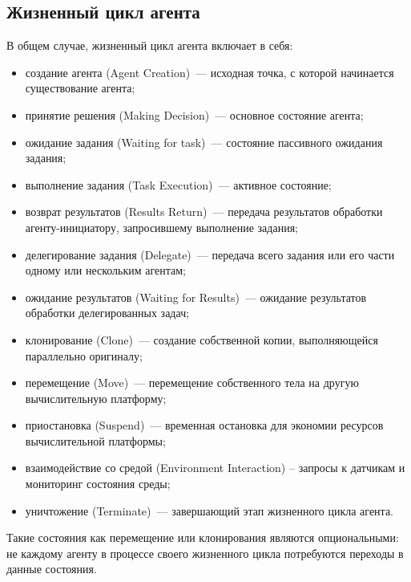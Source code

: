 \subsection{Жизненный цикл агента}
В общем случае, жизненный цикл агента включает в себя:
\begin{itemize}
\item создание агента (Agent Creation)~--- исходная точка, с которой начинается существование агента;
\item принятие решения (Making Decision)~--- основное состояние агента;
\item ожидание задания (Waiting for task)~--- состояние пассивного ожидания задания;
\item выполнение задания (Task Execution)~--- активное состояние;
\item возврат результатов (Results Return)~--- передача результатов обработки агенту-инициатору, запросившему выполнение задания;
\item делегирование задания (Delegate)~--- передача всего задания или его части одному или нескольким агентам;
\item ожидание результатов (Waiting for Results)~--- ожидание результатов обработки делегированных задач;
\item клонирование (Clone)~--- создание собственной копии, выполняющейся параллельно оригиналу;
\item перемещение (Move)~--- перемещение собственного тела на другую вычислительную платформу;
\item приостановка (Suspend)~--- временная остановка для экономии ресурсов вычислительной платформы;
\item взаимодействие со средой (Environment Interaction) – запросы к датчикам и мониторинг состояния среды;
\item уничтожение (Terminate)~--- завершающий этап жизненного цикла агента.
\end{itemize}

Такие состояния как перемещение или клонирования являются опциональными: не каждому агенту в процессе своего жизненного цикла потребуются переходы в данные состояния.

